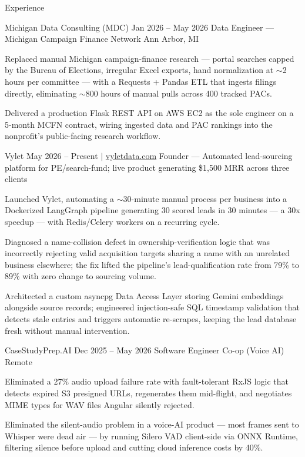 \documentclass[
	11pt
]{../../../template}
\begin{document}
	\begin{rSection}{E}{xperience}
		\begin{rSectionEntry}
			{Michigan Data Consulting (MDC)}
			{Jan 2026 -- May 2026}
			{Data Engineer --- Michigan Campaign Finance Network}
			{}
			{Ann Arbor, MI}

			\item Replaced manual Michigan campaign-finance research --- portal searches capped by the Bureau of Elections, irregular Excel exports, hand normalization at $\sim$2 hours per committee --- with a Requests + Pandas ETL that ingests filings directly, eliminating $\sim$800 hours of manual pulls across 400 tracked PACs.
			\item Delivered a production Flask REST API on AWS EC2 as the sole engineer on a 5-month MCFN contract, wiring ingested data and PAC rankings into the nonprofit's public-facing research workflow.
		\end{rSectionEntry}

		\begin{rSectionEntry}
			{Vylet}
			{May 2026 -- Present $\vert$ \href{https://vyletdata.com}{vyletdata.com}}
			{Founder --- Automated lead-sourcing platform for PE/search-fund; live product generating \$1,500 MRR across three clients}
			{}
			{}

			\item Launched Vylet, automating a $\sim$30-minute manual process per business into a Dockerized LangGraph pipeline generating 30 scored leads in 30 minutes --- a 30x speedup --- with Redis/Celery workers on a recurring cycle.
			\item Diagnosed a name-collision defect in ownership-verification logic that was incorrectly rejecting valid acquisition targets sharing a name with an unrelated business elsewhere; the fix lifted the pipeline's lead-qualification rate from 79\% to 89\% with zero change to sourcing volume.
			\item Architected a custom asyncpg Data Access Layer storing Gemini embeddings alongside source records; engineered injection-safe SQL timestamp validation that detects stale entries and triggers automatic re-scrapes, keeping the lead database fresh without manual intervention.
		\end{rSectionEntry}

		\begin{rSectionEntry}
			{CaseStudyPrep.AI}
			{Dec 2025 -- May 2026}
			{Software Engineer Co-op (Voice AI)}
			{}
			{Remote}

			\item Eliminated a 27\% audio upload failure rate with fault-tolerant RxJS logic that detects expired S3 presigned URLs, regenerates them mid-flight, and negotiates MIME types for WAV files Angular silently rejected.
			\item Eliminated the silent-audio problem in a voice-AI product --- most frames sent to Whisper were dead air --- by running Silero VAD client-side via ONNX Runtime, filtering silence before upload and cutting cloud inference costs by 40\%.
		\end{rSectionEntry}
	\end{rSection}
\end{document}
